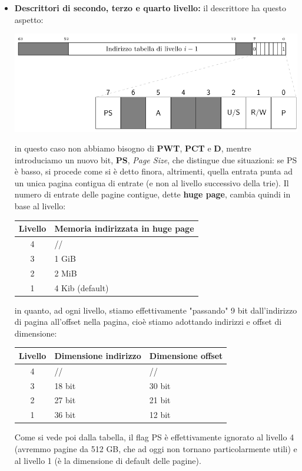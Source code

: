 \documentclass[a4paper,11pt]{article}
\begin{document}
\begin{itemize}
	\item \textbf{Descrittori di secondo, terzo e quarto livello:} il descrittore ha questo aspetto:
\begin{center}
	\includegraphics[scale=0.6]{../figures/mmu_level234.png}
\end{center}
		in questo caso non abbiamo bisogno di \textbf{PWT}, \textbf{PCT} e \textbf{D}, mentre introduciamo un nuovo bit, \textbf{PS}, \textit{Page Size}, che distingue due situazioni: se PS è basso, si procede come si è detto finora, altrimenti, quella entrata punta ad un unica pagina contigua di entrate (e non al livello successivo della trie).
		Il numero di entrate delle pagine contigue, dette \textbf{huge page}, cambia quindi in base al livello:
\begin{table}[H]
	\center {}
	\begin{tabular} { c | p{6cm} }
		\bfseries Livello & \bfseries Memoria indirizzata in huge page\\ 
		\hline 
		4 & // \\ 
		3 & 1 GiB \\ 
		2 & 2 MiB \\ 
		1 & 4 Kib (default) \\
	\end{tabular}
\end{table}
in quanto, ad ogni livello, stiamo effettivamente "passando" 9 bit dall'indirizzo di pagina all'offset nella pagina, cioè stiamo adottando indirizzi e offset di dimensione:
\begin{table}[H]
	\center {}
	\begin{tabular} { c | p{5cm} | p{5cm} }
		\bfseries Livello & \bfseries Dimensione indirizzo & \bfseries Dimensione offset \\ 
		\hline 
		4 & // & // \\ 
		3 & 18 bit & 30  bit \\
		2 & 27 bit & 21 bit \\ 
		1 & 36 bit & 12 bit \\
	\end{tabular}
\end{table}

Come si vede poi dalla tabella, il flag PS è effettivamente ignorato al livello 4 (avremmo pagine da 512 GB, che ad oggi non tornano particolarmente utili) e al livello 1 (è la dimensione di default delle pagine).
\end{itemize}
\end{document}
